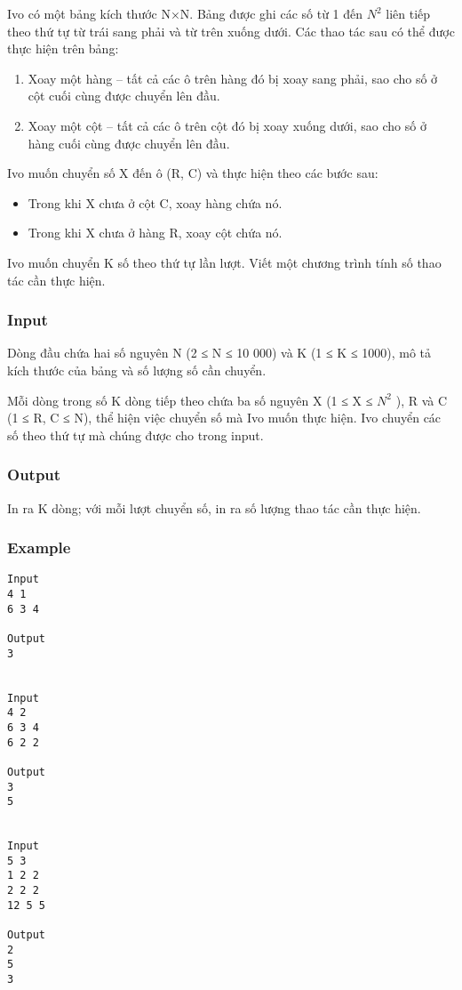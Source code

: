 

Ivo có một bảng kích thước N×N. Bảng được ghi các số từ 1 đến $N^{2}$ liên tiếp theo thứ tự từ trái sang phải và từ trên xuống dưới. Các thao tác sau có thể được thực hiện trên bảng:
\begin{enumerate}
	\item Xoay một hàng – tất cả các ô trên hàng đó bị xoay sang phải, sao cho số ở cột cuối cùng được chuyển lên đầu.
	\item Xoay một cột – tất cả các ô trên cột đó bị xoay xuống dưới, sao cho số ở hàng cuối cùng được chuyển lên đầu.
\end{enumerate}

Ivo muốn chuyển số X đến ô (R, C) và thực hiện theo các bước sau:
\begin{itemize}
	\item Trong khi X chưa ở cột C, xoay hàng chứa nó.
	\item Trong khi X chưa ở hàng R, xoay cột chứa nó.
\end{itemize}

Ivo muốn chuyển K số theo thứ tự lần lượt. Viết một chương trình tính số thao tác cần thực hiện.

\subsubsection{Input}

Dòng đầu chứa hai số nguyên N (2 ≤ N ≤ 10 000) và K (1 ≤ K ≤ 1000), mô tả kích thước của bảng và số lượng số cần chuyển.

Mỗi dòng trong số K dòng tiếp theo chứa ba số nguyên X (1 ≤ X ≤ $N^{2}$ ), R và C (1 ≤ R, C ≤ N), thể hiện việc chuyển số mà Ivo muốn thực hiện. Ivo chuyển các số theo thứ tự mà chúng được cho trong input.

\subsubsection{Output}

In ra K dòng; với mỗi lượt chuyển số, in ra số lượng thao tác cần thực hiện.

\subsubsection{Example}
\begin{verbatim}
Input
4 1
6 3 4

Output
3


Input
4 2
6 3 4
6 2 2

Output
3
5


Input
5 3
1 2 2
2 2 2
12 5 5

Output
2
5
3
\end{verbatim}

